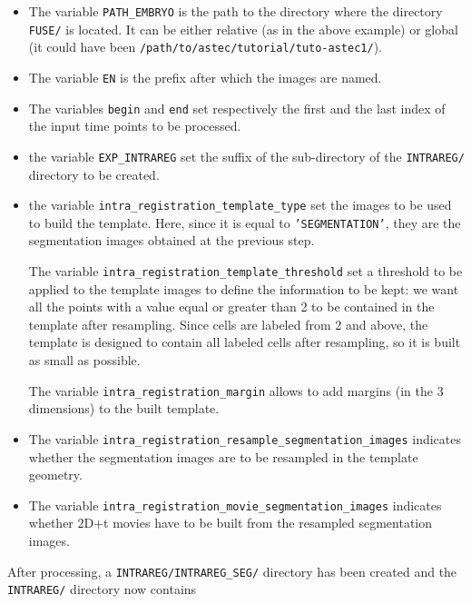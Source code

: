 \begin{itemize}
  \itemsep -0.5ex
  \item The variable \texttt{PATH\_EMBRYO} is the path to the directory where
    the directory \texttt{FUSE/} is located. It can be either relative (as in the
    above example) or
    global (it could have been \texttt{/path/to/astec/tutorial/tuto-astec1/}).
  \item The variable \texttt{EN} is the prefix after which the  images
    are named. 
  \item The variables \texttt{begin} and \texttt{end} set respectively the
    first and the last index of the input time points to be processed.
  \item  the variable \texttt{EXP\_INTRAREG} set the suffix of the
    sub-directory of the \texttt{INTRAREG/} directory to be created.
  \item  the variable \texttt{intra\_registration\_template\_type} set
    the images to be used to build the template. Here, since it is
    equal to \texttt{'SEGMENTATION'}, they are the
    segmentation images obtained at the previous step.

    The variable \texttt{intra\_registration\_template\_threshold} set
    a threshold to be applied to the template images to define the
    information to be kept: we want all the points with a value equal
    or greater than 2 to be contained in the template after
    resampling. Since cells are labeled from 2 and above, the template
    is designed to contain all labeled cells after resampling, so it
    is built as small as possible.

    The variable \texttt{intra\_registration\_margin} allows to add
    margins (in the 3 dimensions) to the built template.
    
  \item The variable
    \texttt{intra\_registration\_resample\_segmentation\_images}
    indicates whether the segmentation images are to be resampled in
    the template geometry. 
  \item The variable
    \texttt{intra\_registration\_movie\_segmentation\_images}
    indicates whether 2D+t movies have to be built from the resampled
    segmentation images.
\end{itemize}

After processing, a \texttt{INTRAREG/INTRAREG\_SEG/} directory has
been created and the \texttt{INTRAREG/} directory now contains

